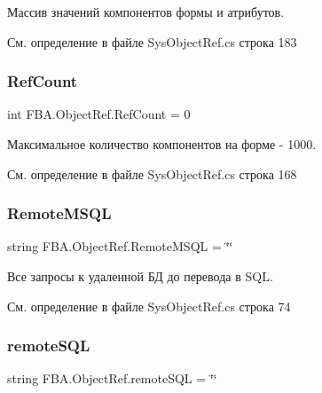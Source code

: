 Массив значений компонентов формы и атрибутов. 



См. определение в файле Sys\+Object\+Ref.\+cs строка 183

\mbox{\label{class_f_b_a_1_1_object_ref_acf527bcb6dced4b9a736eb0eeefc6ecc}} 
\subsubsection{\texorpdfstring{Ref\+Count}{RefCount}}
{\footnotesize\ttfamily int F\+B\+A.\+Object\+Ref.\+Ref\+Count = 0}



Максимальное количество компонентов на форме -\/ 1000. 



См. определение в файле Sys\+Object\+Ref.\+cs строка 168

\mbox{\label{class_f_b_a_1_1_object_ref_a61bc291f53591afb6cdd4a43e9ac9b49}} 
\subsubsection{\texorpdfstring{Remote\+M\+S\+QL}{RemoteMSQL}}
{\footnotesize\ttfamily string F\+B\+A.\+Object\+Ref.\+Remote\+M\+S\+QL = \char`\"{}\char`\"{}}



Все запросы к удаленной БД до перевода в S\+QL. 



См. определение в файле Sys\+Object\+Ref.\+cs строка 74

\mbox{\label{class_f_b_a_1_1_object_ref_a16579d6053e661a4cd48d973386524cd}} 
\subsubsection{\texorpdfstring{remote\+S\+QL}{remoteSQL}}
{\footnotesize\ttfamily string F\+B\+A.\+Object\+Ref.\+remote\+S\+QL = \char`\"{}\char`\"{}}



